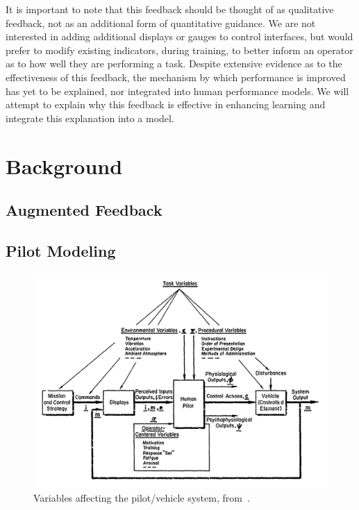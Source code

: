 It is important to note that this feedback should be thought of as qualitative feedback, not as an additional form of quantitative guidance.
We are not interested in adding additional displays or gauges to control interfaces, but would prefer to modify existing indicators, during training, to better inform an operator as to how well they are performing a task.
Despite extensive evidence as to the effectiveness of this feedback, the mechanism by which performance is improved has yet to be explained, nor integrated into human performance models.
We will attempt to explain why this feedback is effective in enhancing learning and integrate this explanation into a model.

\section{Background}

\subsection{Augmented Feedback}
\subsection{Pilot Modeling}
\begin{figure}[tb]
    \begin{center}
        \includegraphics[width=0.8\linewidth]{figures/Introduction/Screen_Shot_2018-07-25_at_10_37_08_AM.png}
        \caption[Variables affecting the pilot/vehicle system]{Variables affecting the pilot/vehicle system, from~\citep{mcruer_mathematical_1974}.}
        \label{figure:mcruer1974}
    \end{center}
\end{figure}

